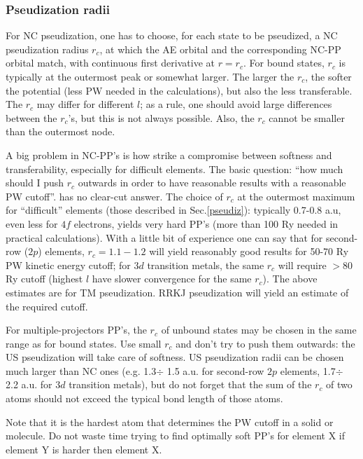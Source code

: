 \documentclass[12pt,a4paper]{article}
\begin{document}
\subsubsection{Pseudization radii}
\label{radii}

For NC pseudization, one has to choose, for each state to be pseudized,
a NC pseudization radius $r_c$, at which the AE orbital and the 
corresponding NC-PP orbital match, with continuous first derivative 
at $r=r_c$. For bound states, $r_c$ is typically at the outermost peak or 
somewhat larger. The larger the $r_c$, the softer the potential 
(less PW needed in the calculations), but also the less transferable.
The $r_c$ may differ for different $l$; as a rule, one should avoid large
differences between the $r_c$'s, but this is not always possible. Also,
the $r_c$ cannot be smaller than the outermost node.

A big problem in NC-PP's is how strike a compromise between softness
and transferability, especially for difficult elements. The basic question:
``how much should I push $r_c$ outwards in order to have reasonable results 
with a reasonable PW cutoff''. has no clear-cut answer. The choice of $r_c$ 
at the outermost maximum for ``difficult'' elements (those described in 
Sec.\ref{pseudiz}): typically 0.7-0.8 a.u, even less for $4f$ electrons, 
yields very hard PP's 
(more than 100 Ry needed in practical calculations). With a little bit of 
experience one can say that for second-row ($2p$) elements, $r_c=1.1-1.2$ 
will yield reasonably good results for 50-70 Ry PW kinetic energy cutoff; 
for $3d$ transition metals, the same $r_c$ will require $> 80$ Ry cutoff
(highest $l$ have slower convergence for the same $r_c$). The above
estimates are for TM pseudization. RRKJ pseudization will yield an
estimate of the required cutoff.

For multiple-projectors PP's, the $r_c$ of unbound states may be chosen 
in the same range as for bound states. Use small $r_c$ and don't try to 
push them outwards: the
US pseudization will take care of softness. US pseudization radii can 
be chosen much larger than NC ones (e.g. 1.3$\div$ 1.5 a.u. for second-row
$2p$ elements, 1.7$\div$ 2.2 a.u. for $3d$ transition metals), but do not
forget that the sum of the $r_c$ of two atoms should not exceed the typical
bond length of those atoms.

Note that it is the hardest atom that determines the PW cutoff in a
solid or molecule. Do not waste time trying to find optimally soft 
PP's for element X if element Y is harder then element X.
\end{document}
